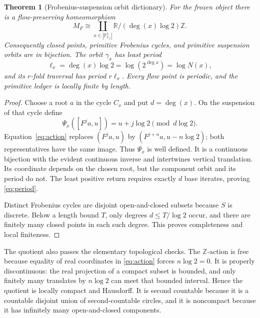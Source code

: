 \documentclass[11pt]{article}
\newtheorem{theorem}{Theorem}
\theoremstyle{definition}
\theoremstyle{remark}
\newcommand{\R}{\mathbb{R}}
\newcommand{\Z}{\mathbb{Z}}
\newcommand{\F}{\mathbb{F}}
\begin{document}
\begin{theorem}[Frobenius-suspension orbit dictionary]
\label{thm:dictionary}
For the frozen object there is a flow-preserving homeomorphism
\begin{equation}
  M_F\cong
  \coprod_{x\in|\mathbb P^1_{\F_2}|}
  \R/(\deg(x)\log2)\Z.
  \label{eq:circle-decomp}
\end{equation}
Consequently closed points, primitive Frobenius cycles, and primitive
suspension orbits are in bijection.  The orbit \(\gamma_x\) has least period
\begin{equation}
  \ell_x=\deg(x)\log2=\log(2^{\deg x})=\log N(x),
  \label{eq:period}
\end{equation}
and its \(r\)-fold traversal has period \(r\ell_x\).  Every flow point is
periodic, and the primitive ledger is locally finite by length.
\end{theorem}

\begin{proof}
Choose a root \(a\) in the cycle \(C_x\) and put \(d=\deg(x)\).  On the
suspension of that cycle define
\[
  \Psi_x([F^j a,u])=u+j\log2\pmod{d\log2}.
\]
Equation~\eqref{eq:action} replaces \((F^j a,u)\) by
\((F^{j+n}a,u-n\log2)\); both representatives have the same image.  Thus
\(\Psi_x\) is well defined.  It is a continuous bijection with the evident
continuous inverse and intertwines vertical translation.  Its coordinate
depends on the chosen root, but the component orbit and its period do not.
The least positive return requires exactly \(d\) base iterates, proving
\eqref{eq:period}.

Distinct Frobenius cycles are disjoint open-and-closed subsets because \(S\)
is discrete.  Below a length bound \(T\), only degrees
\(d\leq T/\log2\) occur, and there are finitely many closed points in each
such degree.  This proves completeness and local finiteness.
\end{proof}

The quotient also passes the elementary topological checks.  The \(\Z\)-action
is free because equality of real coordinates in
\eqref{eq:action} forces \(n\log2=0\).  It is properly discontinuous: the
real projection of a compact subset is bounded, and only finitely many
translates by \(n\log2\) can meet that bounded interval.  Hence the quotient
is locally compact and Hausdorff.  It is second countable because it is a
countable disjoint union of second-countable circles, and it is noncompact
because it has infinitely many open-and-closed components.
\end{document}
